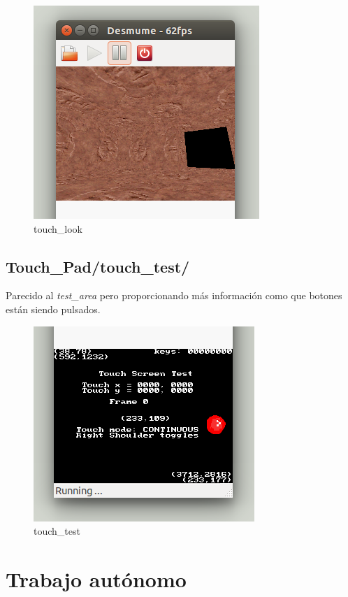 \documentclass[12pt,english]{article}
\begin{document}
    \begin{figure}[H] 
    \centering
    \includegraphics[scale=0.5]{images/touch_look}
    \caption{touch\_look}
    \end{figure}

    \subsection{Touch\_Pad/touch\_test/}

    Parecido al \emph{test\_area} pero proporcionando más información como que botones están siendo pulsados.

    \begin{figure}[H] 
    \centering
    \includegraphics[scale=0.5]{images/touch_test}
    \caption{touch\_test}
    \end{figure}

    \newpage

    \section{Trabajo autónomo}
\end{document}
